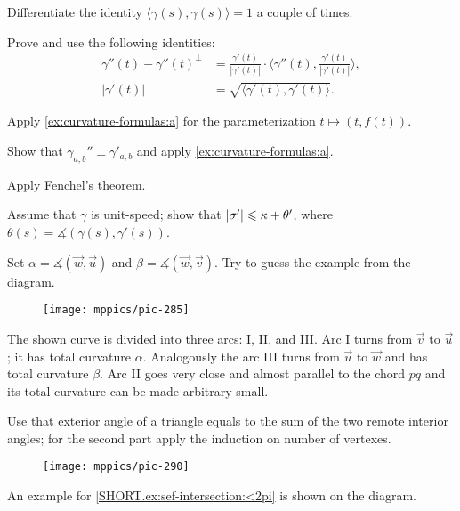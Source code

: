  Differentiate the identity $\langle\gamma(s),\gamma(s)\rangle=1$ a couple of times.

 Prove and use the following identities: 
\begin{align*}
\gamma''(t)-\gamma''(t)^\perp&=\tfrac{\gamma'(t)}{|\gamma'(t)|}\cdot\langle\gamma''(t),\tfrac{\gamma'(t)}{|\gamma'(t)|}\rangle,
\\
|\gamma'(t)|&=\sqrt{\langle \gamma'(t),\gamma'(t)\rangle}.\
\end{align*}

Apply \ref{ex:curvature-formulas:a} for the parameterization $t\mapsto (t,f(t))$.

Show that $\gamma_{a,b}''\perp \gamma'_{a,b}$ and apply \ref{ex:curvature-formulas:a}.

 Apply Fenchel's theorem.

 Assume that $\gamma$ is unit-speed; show that $|\sigma'|\leqslant \kappa+\theta'$, where $\theta(s)=\measuredangle(\gamma(s),\gamma'(s))$.

Set $\alpha=\measuredangle(\vec w,\vec u)$ and $\beta=\measuredangle(\vec w,\vec v)$.
Try to guess the example from the diagram.
\begin{figure}[h!]
\vskip-0mm
\centering
\texttt{[image: mppics/pic-285]}
\vskip0mm
\end{figure}

The shown curve is divided into three arcs: I, II, and III. 
Arc I turns from $\vec v$ to $\vec u$;
it has total curvature $\alpha$.
Analogously the arc III turns from $\vec u$ to $\vec w$  and has total curvature $\beta$. 
Arc II goes very close and almost parallel to the chord $pq$ and its total curvature can be made arbitrary small.


Use that exterior angle of a triangle equals to the sum of the two remote interior angles;
for the second part apply the induction on number of vertexes.

\begin{wrapfigure}{r}{23 mm}
\vskip-0mm
\centering
\texttt{[image: mppics/pic-290]}
\vskip-4mm
\end{wrapfigure}

 An example for \ref{SHORT.ex:sef-intersection:<2pi} is shown on the diagram. 

